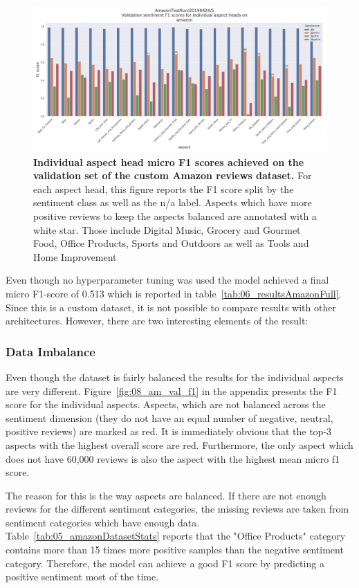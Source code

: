 \begin{figure}[htb]
    \centering
    \includegraphics[width=\textwidth]{figures/06_results/06_am_final_val_f1Sent}
    \caption{\textbf{Individual aspect head micro F1 scores achieved on the validation set of the custom Amazon reviews dataset.} For each aspect head, this figure reports the F1 score split by the sentiment class as well as the n/a label. Aspects which have more positive reviews to keep the aspects balanced are annotated with a white star. Those include Digital Music, Grocery and Gourmet Food, Office Products, Sports and Outdoors as well as Tools and Home Improvement}
    \label{fig:06_am_val_f1sent}
\end{figure}

Even though no hyperparameter tuning was used the model achieved a final micro F1-score of 0.513 which is reported in table~\ref{tab:06_resultsAmazonFull}. Since this is a custom dataset, it is not possible to compare results with other architectures. However, there are two interesting elements of the result:
\medskip

\subsubsection*{Data Imbalance}
Even though the dataset is fairly balanced the results for the individual aspects are very different. Figure~\ref{fig:08_am_val_f1} in the appendix presents the F1 score for the individual aspects. Aspects, which are not balanced across the sentiment dimension {(they do not have an equal number of negative, neutral, positive reviews)} are marked as red. It is immediately obvious that the top-3 aspects with the highest overall score are red. Furthermore, the only aspect which does not have 60,000 reviews is also the aspect with the highest mean micro f1 score. 
\smallskip

The reason for this is the way aspects are balanced. If there are not enough reviews for the different sentiment categories, the missing reviews are taken from sentiment categories which have enough data. Table~\ref{tab:05_amazonDatasetStats} reports that the "Office Products" category contains more than 15 times more positive samples than the negative sentiment category. Therefore, the model can achieve a good F1 score by predicting a positive sentiment most of the time.
\smallskip

